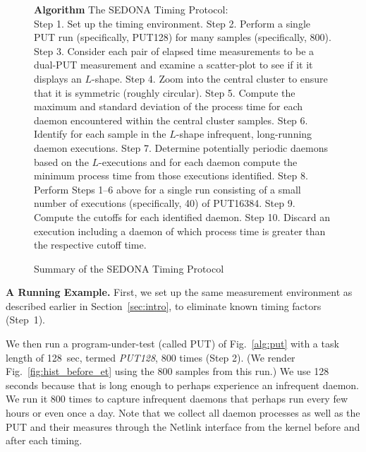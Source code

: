 \documentclass[letter]{ieice}
\begin{document}
\begin{figure}[h]
\begin{center}
\begin{algorithmic}
{\bf Algorithm} The SEDONA Timing Protocol: \\
\STATE Step 1. Set up the timing environment.
\STATE Step 2. Perform a single PUT run (specifically, PUT128) for many samples (specifically, 800).
\STATE Step 3. Consider each pair of elapsed time measurements to be a dual-PUT measurement 
and examine a scatter-plot to see if it it displays an $L$-shape.
\STATE Step 4. Zoom into the central cluster to ensure that it is symmetric (roughly circular).
\STATE Step 5. Compute the maximum and standard deviation of the process time 
for each daemon encountered within the central cluster samples.
\STATE Step 6. Identify for each sample in the $L$-shape infrequent, long-running daemon executions. 
\STATE Step 7. Determine potentially periodic daemons based on the $L$-executions 
and for each daemon compute the minimum process time from those executions identified. 
\STATE Step 8. Perform Steps 1--6 above for a single run 
consisting of a small number of executions (specifically, 40) of PUT16384.  
\STATE Step 9. Compute the cutoffs for each identified daemon. 
\STATE Step 10. Discard an execution including a daemon of which process time is greater than the respective cutoff time.
\end{algorithmic}
\end{center}
\caption{Summary of the SEDONA Timing Protocol\label{alg:find}}
\vspace{-0.25in}
\end{figure}

{\bf A Running Example.} 
{\color{blue}
First, we set up the same measurement environment as described earlier in Section~\ref{sec:intro}, 
to eliminate known timing factors (Step~1).}

We then run a program-under-test (called PUT) of 
Fig.~\ref{alg:put} with a task length of 128~sec, 
termed {\em PUT128}, 800 times (Step 2). 
(We render Fig.~\ref{fig:hist_before_et} using the 800 samples from this run.)
We use 128 seconds because that is long enough to perhaps experience an infrequent daemon. 
We run it 800 times to capture infrequent daemons that perhaps run every few hours or even 
once a day. 
Note that we collect all daemon processes as well as the PUT and their measures 
through the Netlink interface from the kernel before and after each 
timing.
\end{document}
